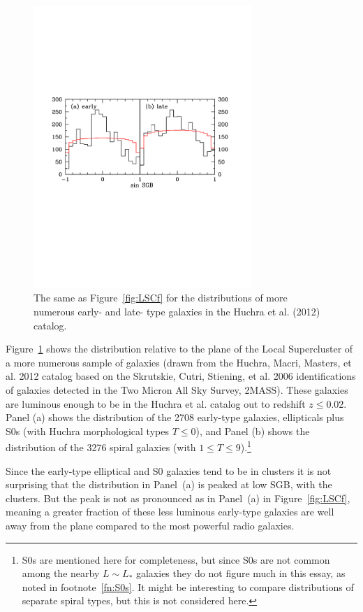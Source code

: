 \documentclass[fleqn,usenatbib]{mnras}
\begin{document}
\begin{figure}
\begin{center}
\includegraphics[angle=0,width=3.25in]{allearlylate.pdf} 
\caption{The same as Figure~\ref{fig:LSCf} for the distributions of more numerous  early- and late- type galaxies in the Huchra et al. (2012) catalog.}\label{fig:commongalaxies}
\end{center}
\end{figure}

Figure~\ref{fig:commongalaxies} shows the distribution relative to the plane of the Local Supercluster of a more numerous sample of galaxies (drawn from the Huchra, Macri, Masters, et al. 2012 catalog based on the Skrutskie, Cutri, Stiening, et al. 2006 identifications  of galaxies detected in the Two Micron All Sky Survey, 2MASS). These galaxies are luminous enough to be in the Huchra et al. catalog out to redshift $z\leq 0.02$. Panel (a) shows the distribution of the 2708 early-type galaxies, ellipticals plus S0s (with Huchra morphological types $T\leq 0$), and Panel (b) shows the distribution of the 3276 spiral galaxies (with $1\leq T\leq 9$).\footnote{S0s are mentioned here for completeness, but since S0s are not common among the nearby $L\sim L_\ast$ galaxies they do not figure much in this essay, as noted in footnote~\ref{fn:S0s}. It might be interesting to compare distributions of separate spiral types, but this is not considered here.} 

Since the early-type elliptical and S0 galaxies tend to be in clusters it is not surprising that the distribution in Panel~(a) is peaked at low SGB, with the clusters. But the peak is not as pronounced as in Panel~(a) in Figure~\ref{fig:LSCf}, meaning a greater fraction of these less luminous early-type galaxies are well away from the plane compared to the most powerful radio galaxies.
\end{document}
